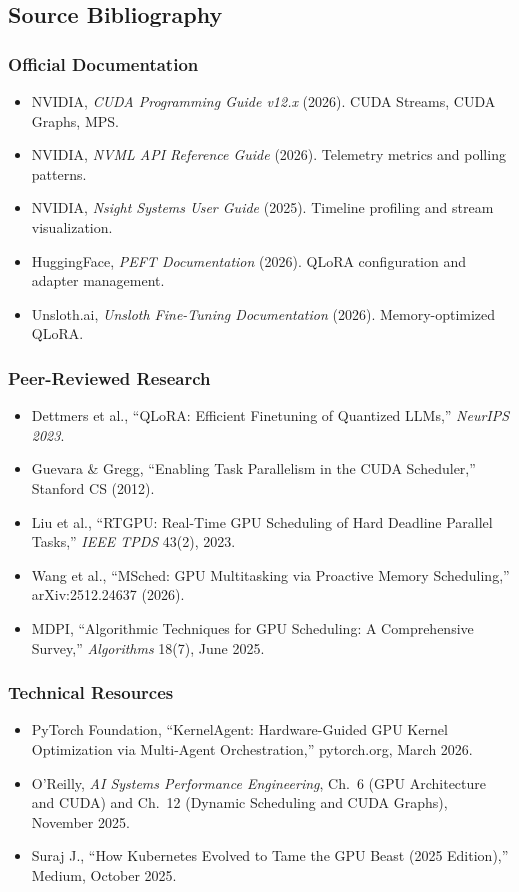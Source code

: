 \documentclass[11pt,letterpaper]{article}
\begin{document}
\subsection{Source Bibliography}

\subsubsection{Official Documentation}
\begin{itemize}[leftmargin=*]
  \item NVIDIA, \textit{CUDA Programming Guide v12.x} (2026). CUDA Streams, CUDA Graphs, MPS.
  \item NVIDIA, \textit{NVML API Reference Guide} (2026). Telemetry metrics and polling patterns.
  \item NVIDIA, \textit{Nsight Systems User Guide} (2025). Timeline profiling and stream visualization.
  \item HuggingFace, \textit{PEFT Documentation} (2026). QLoRA configuration and adapter management.
  \item Unsloth.ai, \textit{Unsloth Fine-Tuning Documentation} (2026). Memory-optimized QLoRA.
\end{itemize}

\subsubsection{Peer-Reviewed Research}
\begin{itemize}[leftmargin=*]
  \item Dettmers et al., ``QLoRA: Efficient Finetuning of Quantized LLMs,'' \textit{NeurIPS 2023}.
  \item Guevara \& Gregg, ``Enabling Task Parallelism in the CUDA Scheduler,'' Stanford CS (2012).
  \item Liu et al., ``RTGPU: Real-Time GPU Scheduling of Hard Deadline Parallel Tasks,'' \textit{IEEE TPDS} 43(2), 2023.
  \item Wang et al., ``MSched: GPU Multitasking via Proactive Memory Scheduling,'' arXiv:2512.24637 (2026).
  \item MDPI, ``Algorithmic Techniques for GPU Scheduling: A Comprehensive Survey,'' \textit{Algorithms} 18(7), June 2025.
\end{itemize}

\subsubsection{Technical Resources}
\begin{itemize}[leftmargin=*]
  \item PyTorch Foundation, ``KernelAgent: Hardware-Guided GPU Kernel Optimization via Multi-Agent Orchestration,'' pytorch.org, March 2026.
  \item O'Reilly, \textit{AI Systems Performance Engineering}, Ch.~6 (GPU Architecture and CUDA) and Ch.~12 (Dynamic Scheduling and CUDA Graphs), November 2025.
  \item Suraj J., ``How Kubernetes Evolved to Tame the GPU Beast (2025 Edition),'' Medium, October 2025.
\end{itemize}
\end{document}
